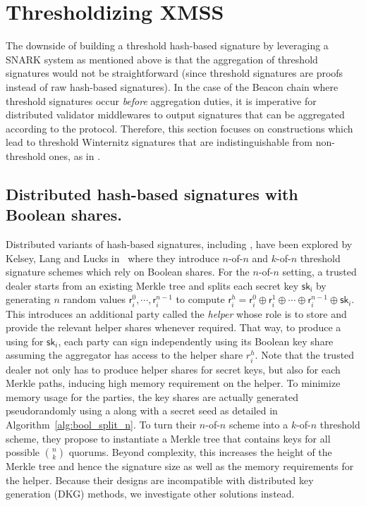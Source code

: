 \section{Thresholdizing XMSS}
The downside of building a threshold hash-based signature by leveraging a SNARK system as mentioned above is that the aggregation of threshold signatures would not be straightforward (since threshold signatures are proofs instead of raw hash-based signatures).
In the case of the Beacon chain where threshold signatures occur \textit{before} aggregation duties, it is imperative for distributed validator middlewares to output signatures that can be aggregated according to the protocol.
Therefore, this section focuses on constructions which lead to threshold Winternitz signatures that are indistinguishable from non-threshold ones, as in \BLS.
\subsection{Distributed hash-based signatures with Boolean shares.}
Distributed variants of hash-based signatures, including \XMSS, have been explored by Kelsey, Lang and Lucks in~\cite{cryptoeprint:2022/241} where they introduce $n$-of-$n$ and $k$-of-$n$ threshold signature schemes which rely on Boolean shares.
For the $n$-of-$n$ setting, a trusted dealer starts from an existing Merkle tree and splits each \WOTS secret key $\mathsf{sk_i}$ by generating $n$ random values $\mathsf{r}^0_i,\cdots,\mathsf{r}^{n-1}_i$ to compute $\mathsf{r}^h_i = \mathsf{r}^0_i \oplus \mathsf{r}^1_i \oplus \cdots \oplus \mathsf{r}^{n-1}_i \oplus \mathsf{sk}_i$.
This introduces an additional party called the \textit{helper} whose role is to store and provide the relevant helper shares whenever required.
That way, to produce a \WOTS using for $\mathsf{sk}_i$, each party can sign independently using its Boolean key share assuming the aggregator has access to the helper share $r^h_i$.
Note that the trusted dealer not only has to produce helper shares for \WOTS secret keys, but also for each Merkle paths, inducing high memory requirement on the helper.
To minimize memory usage for the parties, the key shares are actually generated pseudorandomly using a \PRF along with a secret seed as detailed in Algorithm~\ref{alg:bool_split_n}.
To turn their $n$-of-$n$ scheme into a $k$-of-$n$ threshold scheme, they propose to instantiate a Merkle tree that contains keys for all possible $\binom{n}{k}$ quorums.
Beyond complexity, this increases the height of the Merkle tree and hence the signature size as well as the memory requirements for the helper.
Because their designs are incompatible with distributed key generation (DKG) methods, we investigate other solutions instead. 

